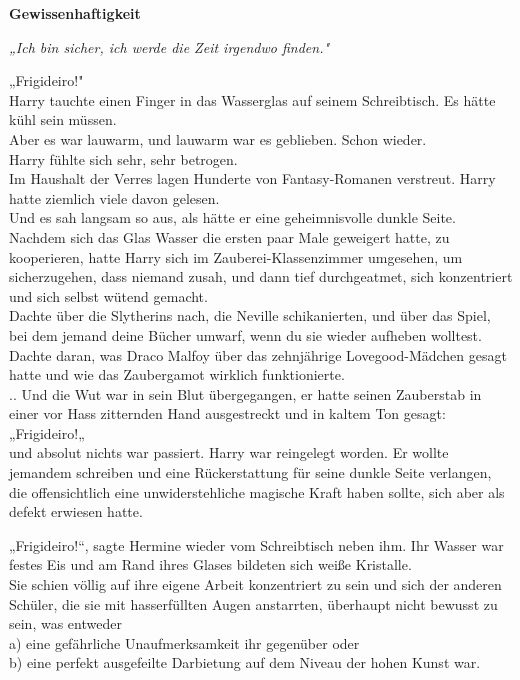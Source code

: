 

\hypertarget{gewissenhaftigkeit}{%

\textbf{Gewissenhaftigkeit}

\emph{„Ich bin sicher, ich werde die Zeit irgendwo finden."}

„Frigideiro!"\\ Harry tauchte einen Finger in das Wasserglas auf seinem Schreibtisch. Es hätte kühl sein müssen.\\ Aber es war lauwarm, und lauwarm war es geblieben. Schon wieder.\\ Harry fühlte sich sehr, sehr betrogen.\\ Im Haushalt der Verres lagen Hunderte von Fantasy-Romanen verstreut. Harry hatte ziemlich viele davon gelesen.\\ Und es sah langsam so aus, als hätte er eine geheimnisvolle dunkle Seite. Nachdem sich das Glas Wasser die ersten paar Male geweigert hatte, zu kooperieren, hatte Harry sich im Zauberei-Klassenzimmer umgesehen, um sicherzugehen, dass niemand zusah, und dann tief durchgeatmet, sich konzentriert und sich selbst wütend gemacht.\\ Dachte über die Slytherins nach, die Neville schikanierten, und über das Spiel, bei dem jemand deine Bücher umwarf, wenn du sie wieder aufheben wolltest.\\ Dachte daran, was Draco Malfoy über das zehnjährige Lovegood-Mädchen gesagt hatte und wie das Zaubergamot wirklich funktionierte.\\ .. Und die Wut war in sein Blut übergegangen, er hatte seinen Zauberstab in einer vor Hass zitternden Hand ausgestreckt und in kaltem Ton gesagt:\\ „Frigideiro!„\\ und absolut nichts war passiert. Harry war reingelegt worden. Er wollte jemandem schreiben und eine Rückerstattung für seine dunkle Seite verlangen, die offensichtlich eine unwiderstehliche magische Kraft haben sollte, sich aber als defekt erwiesen hatte.

„Frigideiro!“, sagte Hermine wieder vom Schreibtisch neben ihm. Ihr Wasser war festes Eis und am Rand ihres Glases bildeten sich weiße Kristalle.\\ Sie schien völlig auf ihre eigene Arbeit konzentriert zu sein und sich der anderen Schüler, die sie mit hasserfüllten Augen anstarrten, überhaupt nicht bewusst zu sein, was entweder\\ a) eine gefährliche Unaufmerksamkeit ihr gegenüber oder\\ b) eine perfekt ausgefeilte Darbietung auf dem Niveau der hohen Kunst war.

}
